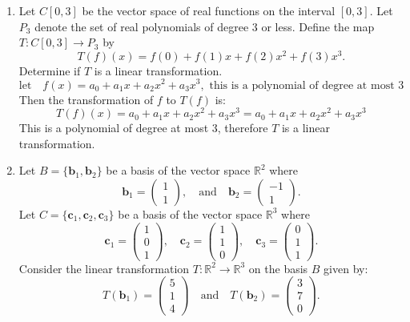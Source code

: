 \documentclass[a3paper,12pt]{extarticle} %
\begin{document}
\begin{enumerate}
    \item Let \( C[0, 3] \) be the vector space of real functions on the interval \([0, 3]\). Let \( P_3 \) denote the set of real polynomials of degree 3 or less. Define the map \( T : C[0, 3] \to P_3 \) by
    \[
    T(f)(x) = f(0) + f(1)x + f(2)x^2 + f(3)x^3.
    \]
    Determine if \( T \) is a linear transformation.
    \[
        \text{let} \quad f(x) = a_0 + a_1x + a_2x^2 + a_3x^3, \text{ this is a polynomial of degree at most } 3
    \]
    Then the transformation of \( f \) to \( T(f) \) is:
    \[
        T(f)(x) = a_0 + a_1x + a_2x^2 + a_3x^3 = a_0 + a_1x + a_2x^2 + a_3x^3
    \]
    This is a polynomial of degree at most \( 3 \), therefore \( T \) is a linear transformation.
    \item Let \( B = \{ \mathbf{b}_1, \mathbf{b}_2 \} \) be a basis of the vector space \(\mathbb{R}^2\) where
    \[
    \mathbf{b}_1 = \begin{pmatrix} 1 \\ 1 \end{pmatrix}, \quad \text{and} \quad \mathbf{b}_2 = \begin{pmatrix} -1 \\ 1 \end{pmatrix}.
    \]
    Let \( C = \{ \mathbf{c}_1, \mathbf{c}_2, \mathbf{c}_3 \} \) be a basis of the vector space \(\mathbb{R}^3\) where
    \[
    \mathbf{c}_1 = \begin{pmatrix} 1 \\ 0 \\ 1 \end{pmatrix}, \quad \mathbf{c}_2 = \begin{pmatrix} 1 \\ 1 \\ 0 \end{pmatrix}, \quad \mathbf{c}_3 = \begin{pmatrix} 0 \\ 1 \\ 1 \end{pmatrix}.
    \]
    Consider the linear transformation \( T : \mathbb{R}^2 \to \mathbb{R}^3 \) on the basis \( B \) given by:
    \[
    T(\mathbf{b}_1) = \begin{pmatrix} 5 \\ 1 \\ 4 \end{pmatrix} \quad \text{and} \quad T(\mathbf{b}_2) = \begin{pmatrix} 3 \\ 7 \\ 0 \end{pmatrix}.
\]
\end{enumerate}
\end{document}
